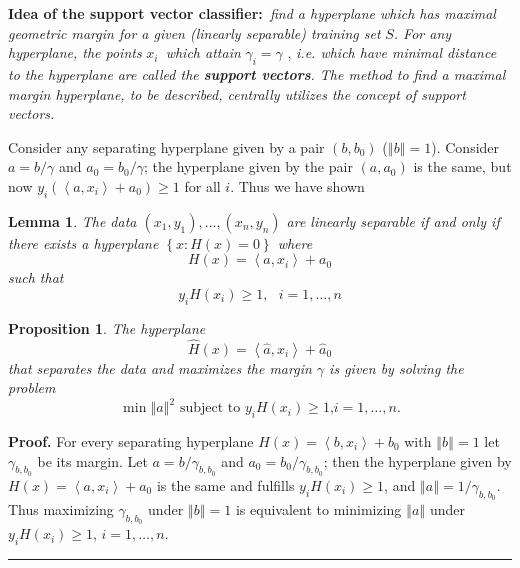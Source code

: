 \documentclass[11pt,twoside]{article}%
\theoremstyle{change}
\newtheorem{lemma}[theorem]{Lemma}
\newtheorem{proposition}[theorem]{Proposition}
\newenvironment{proof}[1][Proof]{\textbf{#1.} }{\ \rule{0.5em}{0.5em}}
\begin{document}
\textbf{Idea of the support vector classifier:}\textit{\ find a hyperplane
which has maximal geometric margin for a given (linearly separable) training
set }$S$\textit{. For any hyperplane, the points }$x_{i}$\textit{\ which
attain }$\gamma_{i}=\gamma$ , \textit{i.e. which have minimal distance to the
hyperplane } \textit{are called the \textbf{support vectors}. The method to
find a maximal margin hyperplane, to be described, centrally utilizes the
concept of support vectors. \bigskip\bigskip}

Consider any separating hyperplane given by a pair $\left(  b,b_{0}\right)  $
($\left\Vert b\right\Vert =1$). Consider $a=b/\gamma$ and $a_{0}=b_{0}/\gamma
$; the hyperplane given by the pair $\left(  a,a_{0}\right)  $ is the same,
but now $y_{i}\left(  \left\langle a,x_{i}\right\rangle +a_{0}\right)  \geq1$
for all $i.$ Thus we have shown

\begin{lemma}
The data $\left(  x_{1},y_{1}\right)  ,\ldots,(x_{n},y_{n})$ are linearly
separable if and only if there exists a hyperplane $\left\{  x:H(x)=0\right\}
$ where
\[
H(x)=\left\langle a,x_{i}\right\rangle +a_{0}%
\]
such that
\[
y_{i}H(x_{i})\geq1,\text{ }i=1,\ldots,n
\]

\end{lemma}

\begin{proposition}
\label{prop-max-margin-hyppl}The hyperplane
\[
\hat{H}(x)=\left\langle \hat{a},x_{i}\right\rangle +\hat{a}_{0}%
\]
that separates the data and maximizes the margin $\gamma$ is given by solving
the problem
\[
\min\left\Vert a\right\Vert ^{2}\text{ subject to }y_{i}H(x_{i})\geq1\text{,
}i=1,\ldots,n.
\]

\end{proposition}

\begin{proof}
For every separating hyperplane $H(x)=\left\langle b,x_{i}\right\rangle
+b_{0}$ with $\left\Vert b\right\Vert =1$ let $\gamma_{b,b_{0}}$ be its
margin. Let $a=b/\gamma_{b,b_{0}}$ and $a_{0}=b_{0}/\gamma_{b,b_{0}}$; then
the hyperplane given by $H(x)=\left\langle a,x_{i}\right\rangle +a_{0}$ is the
same and fulfills $y_{i}H(x_{i})\geq1$, and $\left\Vert a\right\Vert
=1/\gamma_{b,b_{0}}$. Thus maximizing $\gamma_{b,b_{0}}$ under $\left\Vert
b\right\Vert =1$ is equivalent to minimizing $\left\Vert a\right\Vert $ under
$y_{i}H(x_{i})\geq1$, $i=1,\ldots,n.$
\end{proof}
\end{document}
